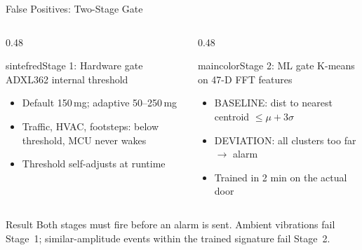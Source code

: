 
\begin{frame}[shrink=15]{False Positives: Two-Stage Gate}
\begin{columns}[T, onlytextwidth]
\begin{column}{0.48\textwidth}
  \begin{colorblock}[white]{sintefred}{Stage 1: Hardware gate}
  \small
  ADXL362 internal threshold\\[2pt]
  \begin{itemize}\setlength\itemsep{1pt}
    \item Default 150\,mg; adaptive 50--250\,mg
    \item Traffic, HVAC, footsteps: below threshold, MCU never wakes
    \item Threshold self-adjusts at runtime
  \end{itemize}
  \end{colorblock}
\end{column}
\begin{column}{0.48\textwidth}
  \begin{colorblock}[white]{maincolor}{Stage 2: ML gate}
  \small
  K-means on 47-D FFT features\\[2pt]
  \begin{itemize}\setlength\itemsep{1pt}
    \item BASELINE: dist to nearest centroid $\leq \mu + 3\sigma$
    \item DEVIATION: all clusters too far $\rightarrow$ alarm
    \item Trained in 2 min on the actual door
  \end{itemize}
  \end{colorblock}
\end{column}
\end{columns}

\vspace{0.3em}
\begin{block}{Result}
  Both stages must fire before an alarm is sent. Ambient vibrations fail Stage~1; similar-amplitude events within the trained signature fail Stage~2.
\end{block}
\end{frame}
